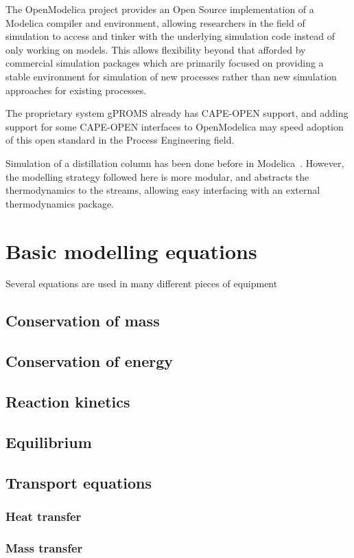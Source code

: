 The OpenModelica project provides an Open Source implementation of a
Modelica compiler and environment, allowing researchers in the field
of simulation to access and tinker with the underlying simulation code
instead of only working on models.  This allows flexibility beyond
that afforded by commercial simulation packages which are primarily
focused on providing a stable environment for simulation of new
processes rather than new simulation approaches for existing processes.

The proprietary system gPROMS already has CAPE-OPEN support, and
adding support for some CAPE-OPEN interfaces to OpenModelica may speed
adoption of this open standard in the Process Engineering field.

Simulation of a distillation column has been done before in Modelica~\citep{duro.morilla2003modelling}.
However, the modelling strategy followed here is more modular, and abstracts the thermodynamics to the streams, allowing easy interfacing with an external thermodynamics package.

\section{Basic modelling equations}
Several equations are used in many different pieces of equipment
\subsection{Conservation of mass}
\subsection{Conservation of energy}
\subsection{Reaction kinetics}



\subsection{Equilibrium}
\subsection{Transport equations}
\subsubsection{Heat transfer}
\subsubsection{Mass transfer}

